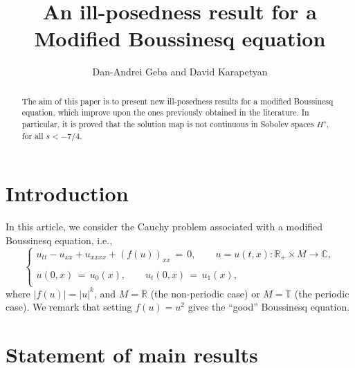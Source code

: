 \documentclass{amsart}
\begin{document}
\title{An ill-posedness result for a Modified Boussinesq equation}

\author{Dan-Andrei Geba and David Karapetyan}

\address{Department of Mathematics, University of Rochester, Rochester, NY 14627}
\address{Department of Mathematics, University of Notre Dame, Notre Dame, IN 46556}
\address{Department of Mathematics, University of Notre Dame, Notre Dame, IN 46556}
\date{}

\begin{abstract}
The aim of this paper is to present new ill-posedness results for a modified Boussinesq equation, which improve upon the ones previously obtained in the literature. In particular, it is proved that the solution map is not continuous in Sobolev spaces $H^s$, for all $s<-7/4$.

\end{abstract}


\maketitle

\section{Introduction}

In this article, we consider the Cauchy problem associated with a modified Boussinesq equation, i.e.,
\begin{equation}
\left\{
\begin{array}{l}
u_{tt}-u_{xx}+u_{xxxx}+(f(u))_{xx}\,=\,0, \qquad u=u(t,x): \mathbb{R}_+\times M \to \mathbb{C},\\
\\
u(0,x)\,=\,u_0(x),\qquad u_t(0,x)\,=\,u_1(x),\\
\end{array}\right.
\label{main}
\end{equation}
where $| f(u)| = |u|^{k}$, and $M=\mathbb{R}$ (the non-periodic case) or $M=\mathbb{T}$ (the periodic case). We remark that setting  $f(u) = u^{2}$ gives the ``good'' Boussinesq equation.

\section{Statement of main results}
\end{document}
